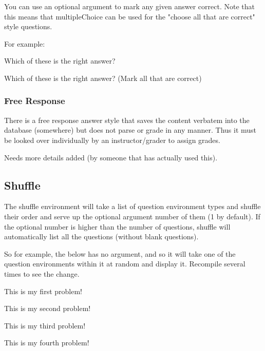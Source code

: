\documentclass{ximera}
\begin{document}
You can use an optional argument to mark any given answer correct. Note that this means that multipleChoice can be used for the "choose all that are correct" style questions.

For example:
\begin{problem}
Which of these is the right answer?
\begin{multipleChoice}
\end{multipleChoice}
\end{problem}

\begin{problem}
Which of these is the right answer? (Mark all that are correct)
\begin{multipleChoice}
\end{multipleChoice}
\end{problem}



\subsubsection{Free Response}
There is a free response answer style that saves the content verbatem into the database (somewhere) but does not parse or grade in any manner. Thus it must be looked over individually by an instructor/grader to assign grades. 

Needs more details added (by someone that has actually used this).

\subsection{Shuffle} 
The shuffle environment will take a list of question environment types and shuffle their order and serve up the optional argument number of them (1 by default). If the optional number is higher than the number of questions, shuffle will automatically list all the questions (without blank questions).

So for example, the below has no argument, and so it will take one of the question environments within it at random and display it. Recompile several times to see the change.

\begin{shuffle}
\begin{problem}
This is my first problem!
\end{problem}

\begin{problem}
This is my second problem!
\end{problem}

\begin{problem}
This is my third problem!
\end{problem}

\begin{problem}
This is my fourth problem!
\end{problem}
\end{shuffle}
\end{document}
